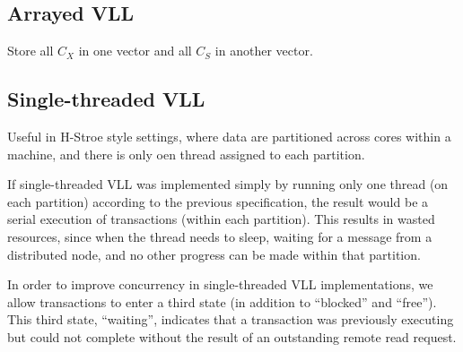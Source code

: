 \documentclass[11pt]{article}
\begin{document}
\subsection{Arrayed VLL}
\label{sec:orgab2aa12}
Store all \(C_X\) in one vector and all \(C_S\) in another vector.
\subsection{Single-threaded VLL}
\label{sec:orga4652a6}
Useful in H-Stroe style settings, where data are partitioned across cores within a machine, and there
is only oen thread assigned to each partition.

If single-threaded VLL was implemented simply by running only one thread (on each partition) according
to the previous specification, the result would be a serial execution of transactions (within each
partition). This results in wasted resources, since when the thread needs to sleep, waiting for a
message from a distributed node, and no other progress can be made within that partition.

In order to improve concurrency in single-threaded VLL implementations, we allow transactions to enter
a third state (in addition to “blocked” and “free”). This third state, “waiting”, indicates that a
transaction was previously executing but could not complete without the result of an outstanding
remote read request.
\end{document}
